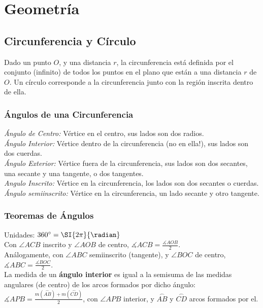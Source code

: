 \pagebreak
\section{Geometría}
\def\svgwidth{\columnwidth}
\subsection{Circunferencia y Círculo}
Dado un punto $O$, y una distancia $r$, la circunferencia está definida por el conjunto (infinito) de todos los puntos en el plano que están a una distancia $r$ de $O$. Un círculo corresponde a la circunferencia junto con la región inscrita dentro de ella.\\

\subsubsection{Ángulos de una Circunferencia}
\textit{Ángulo de Centro:} Vértice en el centro, sus lados son dos radios.\\
\textit{Ángulo Interior:} Vértice dentro de la circunferencia (no en ella!), sus lados son dos cuerdas.\\
\textit{Ángulo Exterior:} Vértice fuera de la circunferencia, sus lados son dos secantes, una secante y una tangente, o dos tangentes.\\
\textit{Angulo Inscrito:} Vértice en la circunferencia, los lados son dos secantes o cuerdas.\\
\textit{Ángulo semiinscrito:} Vértice en la circunferencia, un lado secante y otro tangente.\\

\subsubsection{Teoremas de Ángulos}
Unidades: $360^{\circ} = \SI{2\pi}{\radian}$\\

Con $\angle ACB$ inscrito y $\angle AOB$ de centro,
$\measuredangle ACB = \frac{\measuredangle AOB}{2}$.\\

Análogamente, con $\angle ABC$ semiinscrito (tangente), y $\angle BOC$ de centro, $\measuredangle ABC = \frac{\measuredangle BOC}{2}$.\\

La medida de un \textbf{ángulo interior} es igual a la semisuma de las medidas angulares (de centro) de los arcos formados por dicho ángulo:
$\measuredangle APB = \frac{m(\stackrel\frown{AB}) + m(\stackrel\frown{CD})}{2}$, con $\angle APB$ interior, y $\stackrel\frown{AB}$ y $\stackrel\frown{CD}$ arcos formados por el.\\


